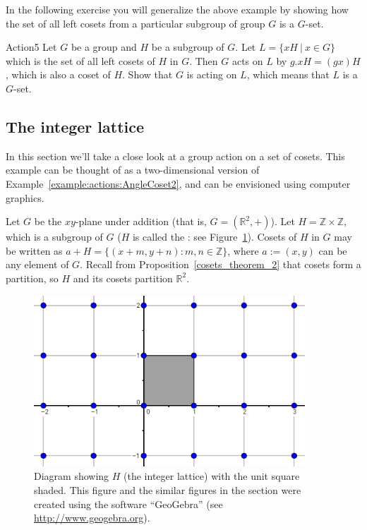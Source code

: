 In the following exercise you will generalize the above example by showing how the set of all left cosets from a particular subgroup of group $G$ is a $G$-set.

\begin{exercise}{Action5}
Let $G$ be a group and $H$ be a subgroup of $G$. Let $L=\{xH~|~x\in G \}$ which is the set of all left cosets of $H$ in $G$. Then $G$ acts on $L$ by $g.xH = (gx)H$, which is also a coset of $H$. Show that $G$ is acting on $L$, which means that $L$ is a $G$-set.
\end{exercise}


\subsection{The integer lattice}\label{subsec:lattice}

In this section we'll take a close look at a group action on a set of cosets.  This example can be thought of as a two-dimensional version of Example~\ref{example:actions:AngleCoset2}, and can be envisioned using computer graphics.


Let $G$ be the $xy$-plane under addition (that is, $G=(\mathbb {R}^2,+)$).  Let $H=\mathbb{Z}\times \mathbb{Z}$, which is a subgroup of $G$ ($H$ is called the : see Figure~\ref{fig:HwithUnitSquare}).
Cosets of $H$ in $G$ may be written as $a+H=\{(x+m, y+n):m,n \in\mathbb{ Z}\}$, where $a :=(x,y)$ can be any element of $G$. Recall from Proposition~\ref{cosets_theorem_2} that cosets form a partition, so $H$ and its cosets partition $\mathbb{R}^2$.

\begin{figure}[htpb]
\begin{center}
\includegraphics[width=4in]{images/Lattice_Hwithunitsquare.png}
\caption{\label{fig:HwithUnitSquare}Diagram showing $H$ (the integer lattice) with the unit square shaded. This figure and the similar figures in the section were created using the software ``GeoGebra'' (see \url{http://www.geogebra.org}).  }
\end{center}
\end{figure}

